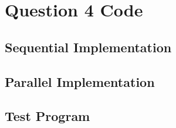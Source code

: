 \documentclass[11pt]{article}
\begin{document}
\section{Question 4 Code}
\subsection{Sequential Implementation}

\subsection{Parallel Implementation}

\subsection{Test Program}

\end{document}
